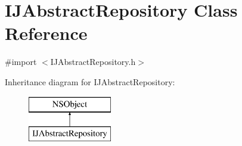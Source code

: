 \hypertarget{interface_i_j_abstract_repository}{\section{I\+J\+Abstract\+Repository Class Reference}
\label{interface_i_j_abstract_repository}
}


{\ttfamily \#import $<$I\+J\+Abstract\+Repository.\+h$>$}

Inheritance diagram for I\+J\+Abstract\+Repository\+:\begin{figure}[H]
\begin{center}
\leavevmode
\includegraphics[height=2.000000cm]{interface_i_j_abstract_repository}
\end{center}
\end{figure}

